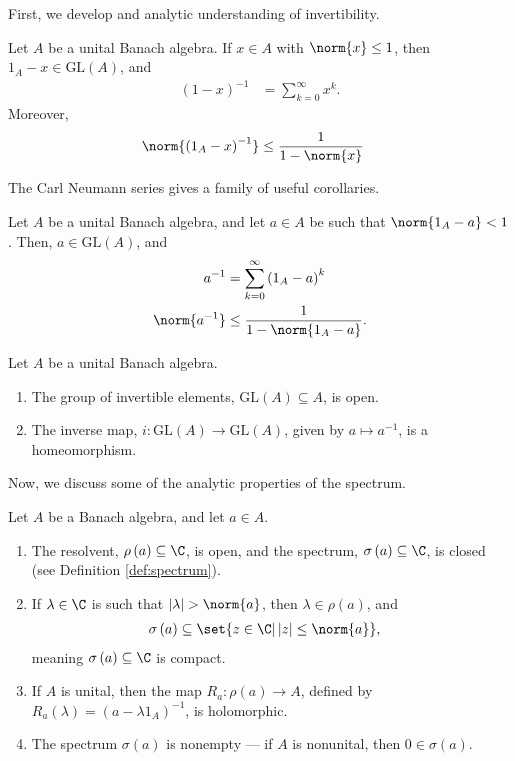 First, we develop and analytic understanding of invertibility.
\begin{proposition}
  Let $A$ be a unital Banach algebra. If $x\in A$ with $\norm{x}\leq 1$, then $1_A - x\in \text{GL}\left( A \right)$, and
  \begin{align*}
    \left( 1-x \right)^{-1} &= \sum_{k=0}^{\infty}x^k.
  \end{align*}
  Moreover,
  \begin{align*}
    \norm{\left( 1_A - x \right)^{-1}} &\leq \frac{1}{1-\norm{x}}
  \end{align*}
\end{proposition}
The Carl Neumann series gives a family of useful corollaries.
\begin{corollary}
  Let $A$ be a unital Banach algebra, and let $a\in A$ be such that $\norm{1_A - a} < 1$. Then, $a\in \text{GL}\left( A \right)$, and
  \begin{align*}
    a^{-1} &= \sum_{k=0}^{\infty}\left( 1_A - a \right)^{k}\\
    \norm{a^{-1}} &\leq \frac{1}{1-\norm{1_A - a}}.
  \end{align*}
\end{corollary}
\begin{proposition}
  Let $A$ be a unital Banach algebra.
  \begin{enumerate}[(1)]
    \item The group of invertible elements, $\text{GL}\left( A \right)\subseteq A$, is open.
    \item The inverse map, $i\colon \text{GL}\left( A \right)\rightarrow \text{GL}\left( A \right)$, given by $a\mapsto a^{-1}$, is a homeomorphism.
  \end{enumerate}
\end{proposition}
Now, we discuss some of the analytic properties of the spectrum.
\begin{theorem}
  Let $A$ be a Banach algebra, and let $a\in A$.
  \begin{enumerate}[(1)]
    \item The resolvent, $\rho\left( a \right)\subseteq \C$, is open, and the spectrum, $\sigma\left( a \right)\subseteq \C$, is closed (see Definition \ref{def:spectrum}).
    \item If $\lambda\in\C$ is such that $\left\vert \lambda \right\vert > \norm{a}$, then $\lambda\in \rho(a)$, and 
      \begin{align*}
        \sigma\left( a \right) &\subseteq \set{z\in\C | \left\vert z \right\vert\leq \norm{a}},
      \end{align*}
      meaning $\sigma\left( a \right)\subseteq \C$ is compact.
    \item If $A$ is unital, then the map $R_a\colon \rho\left( a \right)\rightarrow A$, defined by $R_a\left( \lambda \right) = \left( a - \lambda 1_A \right)^{-1}$, is holomorphic.
    \item The spectrum $\sigma\left( a \right)$ is nonempty --- if $A$ is nonunital, then $0\in \sigma\left( a \right)$.
  \end{enumerate}
\end{theorem}
